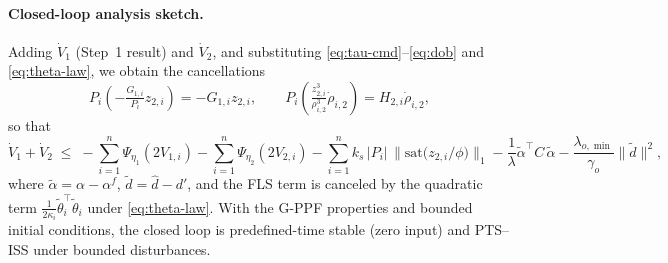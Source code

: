 \documentclass[pdflatex,sn-mathphys-num]{sn-jnl}%
\theoremstyle{thmstyleone}%
\theoremstyle{thmstyletwo}%
\newtheorem{remark}{Remark}%
\theoremstyle{thmstylethree}%
\begin{document}
\paragraph{Closed-loop analysis sketch.}
Adding $\dot V_1$ (Step~1 result) and $\dot V_2$, and substituting \eqref{eq:tau-cmd}–\eqref{eq:dob} and
\eqref{eq:theta-law}, we obtain the cancellations
\[
P_i\!\left(-\tfrac{G_{1,i}}{P_i}z_{2,i}\right)=-G_{1,i}z_{2,i},\qquad
P_i\!\left(\tfrac{z_{2,i}^3}{\rho_{i,2}^3}\dot\rho_{i,2}\right)=H_{2,i}\dot\rho_{i,2},
\]
so that
\[
\dot V_1+\dot V_2
\;\le\;
-\sum_{i=1}^n \Psi_{\eta_1}(2V_{1,i})
-\sum_{i=1}^n \Psi_{\eta_2}(2V_{2,i})
-\sum_{i=1}^n k_s\,|P_i|\,\Big\|\mathrm{sat}\big(z_{2,i}/\phi\big)\Big\|_1
-\frac{1}{\lambda}\tilde\alpha^\top C\,\tilde\alpha
-\frac{\lambda_{o,\min}}{\gamma_o}\|\tilde d\|^2,
\]
where $\tilde\alpha=\alpha-\alpha^f$, $\tilde d=\hat d-d'$, and the FLS term is canceled by the quadratic term
$\frac{1}{2\kappa_i}\tilde\theta_i^\top\tilde\theta_i$ under \eqref{eq:theta-law}.
With the G-PPF properties and bounded initial conditions, the closed loop is
predefined-time stable (zero input) and PTS–ISS under bounded disturbances.






\end{document}
